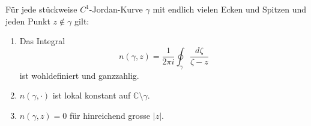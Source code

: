 \begin{lemma}
    Für jede stückweise $C^1$-Jordan-Kurve $\gamma$ mit endlich vielen Ecken und Spitzen und jeden Punkt $z \notin \gamma$ gilt: \begin{enumerate}
        \item Das Integral
        \[
            n(\gamma, z) = \frac{1}{2\pi i} \oint_{\gamma} \frac{d\zeta}{\zeta - z}
        \]
        ist wohldefiniert und ganzzahlig.
        \item $n(\gamma, \cdot)$ ist lokal konstant auf $\mathbb{C} \setminus \gamma$.
        \item $n(\gamma, z) = 0$ für hinreichend grosse $\left|z\right|$.
    \end{enumerate}
\end{lemma}